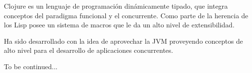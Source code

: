 
Clojure es un lenguaje de programación dinámicamente tipado, que integra conceptos del paradigma funcional y el concurrente. Como parte de la herencia de los Lisp posee un sistema de macros que le da un alto nivel de extensibilidad.

Ha sido desarrollado con la idea de aprovechar la JVM proveyendo conceptos de alto nivel para el desarrollo de aplicaciones concurrentes.

To be continued...
